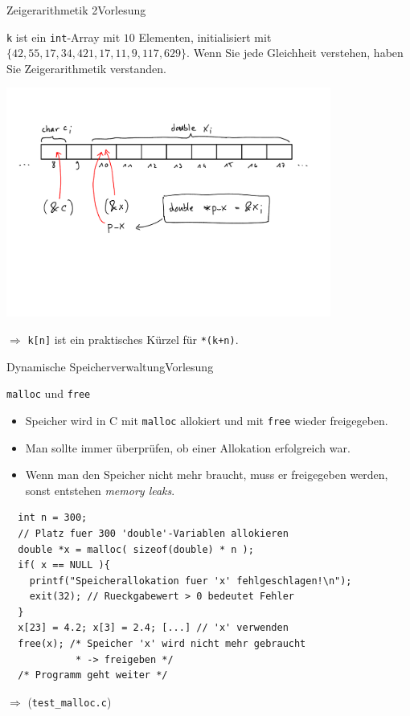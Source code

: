 \documentclass[xcolor=dvipsnames]{beamer}
\newcounter{lecturecounter}
\begin{document}
\begin{frame}[fragile]{Zeigerarithmetik 2}{Vorlesung }
\begin{block}{}
  \texttt{k} ist ein \texttt{int}-Array mit $10$ Elementen, initialisiert mit $\lbrace 42, 55, 17, 34, 421, 17, 11, 9, 117, 629 \rbrace$. Wenn Sie jede Gleichheit verstehen, haben Sie Zeigerarithmetik verstanden.
\end{block}
\centering
\includegraphics[page=3,width=0.8\textwidth,clip=true,trim=0 3cm 0 2cm]{graphics/c_kurs_tafel}
\begin{block}{}
  $\Rightarrow$ \verb|k[n]| ist ein praktisches Kürzel für \verb|*(k+n)|.
\end{block}

\end{frame}

\begin{frame}[fragile]{Dynamische Speicherverwaltung}{Vorlesung }
  \begin{block}{\texttt{malloc} und \texttt{free}}
    \begin{itemize}
      \item{Speicher wird in C mit \texttt{malloc} allokiert und mit \texttt{free} wieder freigegeben.}
      \item{Man sollte immer überprüfen, ob einer Allokation erfolgreich war.}
      \item{Wenn man den Speicher nicht mehr braucht, muss er freigegeben werden, sonst entstehen \emph{memory leaks}.}
    \end{itemize} 
  \end{block}
\begin{lstlisting}
  int n = 300;
  // Platz fuer 300 'double'-Variablen allokieren
  double *x = malloc( sizeof(double) * n );
  if( x == NULL ){
    printf("Speicherallokation fuer 'x' fehlgeschlagen!\n"); 
    exit(32); // Rueckgabewert > 0 bedeutet Fehler
  }
  x[23] = 4.2; x[3] = 2.4; [...] // 'x' verwenden
  free(x); /* Speicher 'x' wird nicht mehr gebraucht
            * -> freigeben */
  /* Programm geht weiter */
\end{lstlisting}
$\Rightarrow$ (\verb|test_malloc.c|)
\end{frame}
\end{document}
